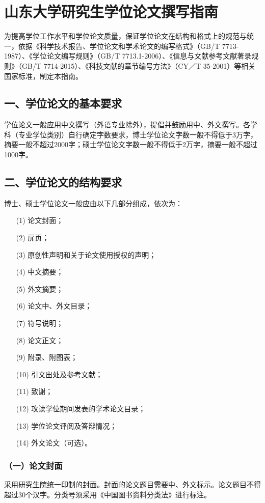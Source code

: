 \chapter{山东大学研究生学位论文撰写指南}

为提高学位工作水平和学位论文质量，保证学位论文在结构和格式上的规范与统一，依据《科学技术报告、学位论文和学术论文的编写格式》（GB/T 7713-1987）、《学位论文编写规则》（GB/T 7713.1-2006）、《信息与文献参考文献著录规则》（GB/T 7714-2015）、《科技文献的章节编号方法》（CY／T 35-2001）等相关国家标准，制定本指南。

\section{一、学位论文的基本要求}
学位论文一般应用中文撰写（外语专业除外），提倡并鼓励用中、外文撰写。各学科（专业学位类别）自行确定字数要求，博士学位论文字数一般不得低于3万字，摘要一般不超过2000字；硕士学位论文字数一般不得低于2万字，摘要一般不超过1000字。

\section{二、学位论文的结构要求}
博士、硕士学位论文一般应由以下几部分组成，依次为：
\begin{enumerate}
\item[(1)] 论文封面；
\item[(2)] 扉页；
\item[(3)] 原创性声明和关于论文使用授权的声明；
\item[(4)] 中文摘要；
\item[(5)] 外文摘要；
\item[(6)] 论文中、外文目录；
\item[(7)] 符号说明；
\item[(8)] 论文正文；
\item[(9)] 附录、附图表；
\item[(10)] 引文出处及参考文献；
\item[(11)] 致谢；
\item[(12)] 攻读学位期间发表的学术论文目录；
\item[(13)] 学位论文评阅及答辩情况；
\item[(14)] 外文论文（可选）。
\end{enumerate}

\subsection{（一）论文封面}
采用研究生院统一印制的封面。封面的论文题目需要中、外文标示。论文题目不得超过30个汉字。分类号须采用《中国图书资料分类法》进行标注。

